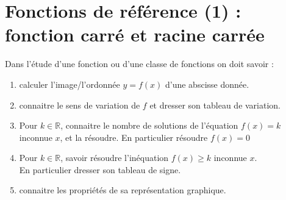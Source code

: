 \documentclass[main.tex]{subfiles}
\begin{document}
 
\cleardoublepage
{}  
\pagestyle{scrheadings} %
\onehalfspacing 
\setcounter{chapter}{8}

\chapter{Fonctions de référence (1) : fonction carré et racine carrée}
 

\noindent Dans l'étude d'une fonction ou d'une classe de fonctions on doit savoir :
\begin{enumerate}[leftmargin=*,label=\arabic*)]
	\item calculer l'image/l'ordonnée $y=f(x)$ d'une abscisse donnée.
	\item connaitre le sens de variation de $f$ et dresser son tableau de variation.
	\item Pour $k\in\mathbb{R}$, connaitre le nombre de solutions de l'équation $f(x)=k$ inconnue $x$, et la résoudre. 
	En particulier résoudre $f(x)=0$
	\item Pour $k\in\mathbb{R}$, savoir résoudre l'inéquation $f(x)\geqslant k$ inconnue $x$.\\
	En particulier dresser son tableau de signe.
	\item connaitre les propriétés de sa représentation graphique.  
\end{enumerate}
\vspace{-1em}
%	 
\newpage 
{}  
\pagestyle{scrheadings} %
\onehalfspacing  
\end{document}
